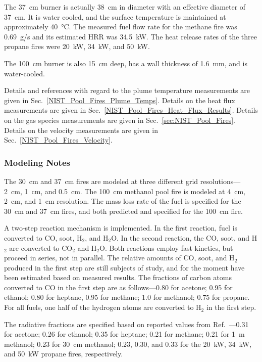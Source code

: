 The 37~cm burner is actually 38~cm in diameter with an effective diameter of 37~cm. It is water cooled, and the surface temperature is maintained at approximately 40~\unit{\degreeCelsius}.  The measured fuel flow rate for the methane fire was 0.69~g/s and its estimated HRR was 34.5~kW. The heat release rates of the three propane fires were 20~kW, 34~kW, and 50~kW.

The 100~cm burner is also 15~cm deep, has a wall thickness of 1.6~mm, and is water-cooled.

Details and references with regard to the plume temperature measurements are given in Sec.~\ref{NIST_Pool_Fires_Plume_Temps}. Details on the heat flux measurements are given in Sec.~\ref{NIST_Pool_Fires_Heat_Flux_Results}. Details on the gas species measurements are given in Sec.~\ref{sec:NIST_Pool_Fires}. Details on the velocity measurements are given in Sec.~\ref{NIST_Pool_Fires_Velocity}.


\subsubsection{Modeling Notes}

The 30~cm and 37~cm fires are modeled at three different grid resolutions---2~cm, 1~cm, and 0.5~cm. The 100~cm methanol pool fire is modeled at 4~cm, 2~cm, and 1~cm resolution. The mass loss rate of the fuel is specified for the 30~cm and 37~cm fires, and both predicted and specified for the 100~cm fire.

A two-step reaction mechanism is implemented. In the first reaction, fuel is converted to CO, soot, H$_2$, and H$_2$O. In the second reaction, the CO, soot, and H$_2$ are converted to CO$_2$ and H$_2$O. Both reactions employ fast kinetics, but proceed in series, not in parallel. The relative amounts of CO, soot, and H$_2$ produced in the first step are still subjects of study, and for the moment have been estimated based on measured results. The fractions of carbon atoms converted to CO in the first step are as follows---0.80 for acetone; 0.95 for ethanol; 0.80 for heptane, 0.95 for methane; 1.0 for methanol; 0.75 for propane. For all fuels, one half of the hydrogen atoms are converted to H$_2$ in the first step.

The radiative fractions are specified based on reported values from Ref.~\cite{Sung:TN2162r1}---0.31 for acetone; 0.26 for ethanol; 0.35 for heptane; 0.21 for methane; 0.21 for 1~m methanol; 0.23 for 30~cm methanol; 0.23, 0.30, and 0.33 for the 20~kW, 34~kW, and 50~kW propane fires, respectively.


